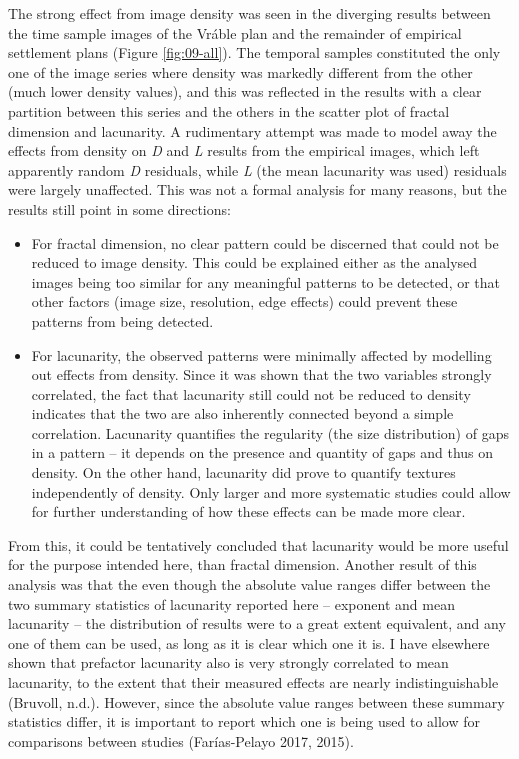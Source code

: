 \documentclass[
  12pt,
  a4paper, twoside]{book}
\begin{document}
The strong effect from image density was seen in the diverging results between the time sample images of the Vráble plan and the remainder of empirical settlement plans (Figure \ref{fig:09-all}). The temporal samples constituted the only one of the image series where density was markedly different from the other (much lower density values), and this was reflected in the results with a clear partition between this series and the others in the scatter plot of fractal dimension and lacunarity. A rudimentary attempt was made to model away the effects from density on \emph{D} and \emph{L} results from the empirical images, which left apparently random \emph{D} residuals, while \emph{L} (the mean lacunarity was used) residuals were largely unaffected. This was not a formal analysis for many reasons, but the results still point in some directions:

\begin{itemize}
\item
  For fractal dimension, no clear pattern could be discerned that could not be reduced to image density. This could be explained either as the analysed images being too similar for any meaningful patterns to be detected, or that other factors (image size, resolution, edge effects) could prevent these patterns from being detected.
\item
  For lacunarity, the observed patterns were minimally affected by modelling out effects from density. Since it was shown that the two variables strongly correlated, the fact that lacunarity still could not be reduced to density indicates that the two are also inherently connected beyond a simple correlation. Lacunarity quantifies the regularity (the size distribution) of gaps in a pattern -- it depends on the presence and quantity of gaps and thus on density. On the other hand, lacunarity did prove to quantify textures independently of density. Only larger and more systematic studies could allow for further understanding of how these effects can be made more clear.
\end{itemize}

From this, it could be tentatively concluded that lacunarity would be more useful for the purpose intended here, than fractal dimension. Another result of this analysis was that the even though the absolute value ranges differ between the two summary statistics of lacunarity reported here -- exponent and mean lacunarity -- the distribution of results were to a great extent equivalent, and any one of them can be used, as long as it is clear which one it is. I have elsewhere shown that prefactor lacunarity also is very strongly correlated to mean lacunarity, to the extent that their measured effects are nearly indistinguishable (Bruvoll, n.d.). However, since the absolute value ranges between these summary statistics differ, it is important to report which one is being used to allow for comparisons between studies (Farías-Pelayo 2017, 2015).
\end{document}

